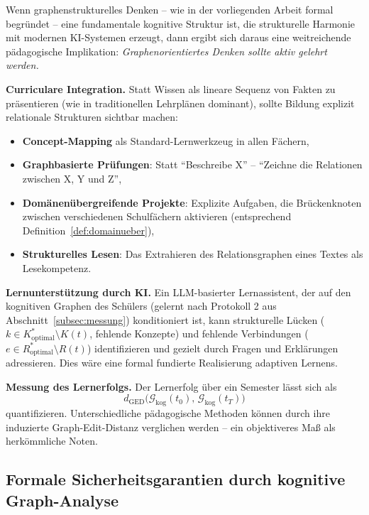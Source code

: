 ﻿\documentclass[12pt,a4paper]{article}
\theoremstyle{plain}
\theoremstyle{definition}
\theoremstyle{remark}
\newcommand{\GG}{\mathcal{G}}
\begin{document}
Wenn graphenstrukturelles Denken -- wie in der vorliegenden Arbeit formal begründet -- eine fundamentale kognitive Struktur ist, die strukturelle Harmonie mit modernen KI-Systemen erzeugt, dann ergibt sich daraus eine weitreichende pädagogische Implikation: \emph{Graphenorientiertes Denken sollte aktiv gelehrt werden.}

\textbf{Curriculare Integration.} Statt Wissen als lineare Sequenz von Fakten zu präsentieren (wie in traditionellen Lehrplänen dominant), sollte Bildung explizit relationale Strukturen sichtbar machen:
\begin{itemize}
  \item \textbf{Concept-Mapping} als Standard-Lernwerkzeug in allen Fächern,
  \item \textbf{Graphbasierte Prüfungen}: Statt ``Beschreibe X'' -- ``Zeichne die Relationen zwischen X, Y und Z'',
  \item \textbf{Domänenübergreifende Projekte}: Explizite Aufgaben, die Brückenknoten zwischen verschiedenen Schulfächern aktivieren (entsprechend Definition~\ref{def:domainueber}),
  \item \textbf{Strukturelles Lesen}: Das Extrahieren des Relationsgraphen eines Textes als Lesekompetenz.
\end{itemize}

\textbf{Lernunterstützung durch KI.} Ein LLM-basierter Lernassistent, der auf den kognitiven Graphen des Schülers (gelernt nach Protokoll 2 aus Abschnitt~\ref{subsec:messung}) konditioniert ist, kann strukturelle Lücken ($k \in K^*_{\text{optimal}} \setminus K(t)$, fehlende Konzepte) und fehlende Verbindungen ($e \in R^*_{\text{optimal}} \setminus R(t)$) identifizieren und gezielt durch Fragen und Erklärungen adressieren. Dies wäre eine formal fundierte Realisierung adaptiven Lernens.

\textbf{Messung des Lernerfolgs.} Der Lernerfolg über ein Semester lässt sich als
\[
  d_{\text{GED}}\!\bigl(\GG_{\text{kog}}(t_0),\, \GG_{\text{kog}}(t_T)\bigr)
\]
quantifizieren. Unterschiedliche pädagogische Methoden können durch ihre induzierte Graph-Edit-Distanz verglichen werden -- ein objektiveres Maß als herkömmliche Noten.

\subsection{Formale Sicherheitsgarantien durch kognitive Graph-Analyse}
\label{subsec:sicherheit}
\end{document}
